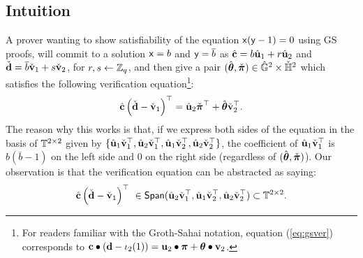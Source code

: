 \subsection{Intuition} \label{sect:intuition}
%
A prover wanting to show satisfiability of the equation  $\mathsf{x}(\mathsf{y}-1)=0$ using GS proofs, will commit to a solution  
$\mathsf{x}=b$ and $\mathsf{y}=\overline{b}$ as $\hat{\mathbf{c}}=b \hat{\mathbf{u}}_1 + r \hat{\mathbf{u}}_2$ and 
 $\check{\mathbf{d}}=\overline{b} \check{\mathbf{v}}_1 + s \check{\mathbf{v}}_2$, for $r,s \leftarrow \mathbb{Z}_q$, and then give a pair $(\hat{{\boldsymbol \theta}},\check{{\boldsymbol \pi}})
\in {\ensuremath{\hat{\mathbb{G}}}}^{2} \times {\ensuremath{\check{\mathbb{H}}}}^{2}$ which satisfies the following verification equation\footnote{For readers familiar with the Groth-Sahai notation, equation (\ref{eq:gsver}) corresponds to 
$\mathbf{c} \bullet \left(\mathbf{d}-\iota_2(1)\right) = \mathbf{u}_2 \bullet {\boldsymbol \pi} + {\boldsymbol \theta} \bullet \mathbf{v}_2$.}:
\begin{equation} \label{eq:gsver}
\hat{\mathbf{c}} \left(\check{\mathbf{d}}-
 \check{\mathbf{v}}_1\right)^{\top}=\hat{\mathbf{u}}_2  
\check{\boldsymbol \pi}^{\top}+ \hat{\boldsymbol \theta}   \check{\mathbf{v}}_2^{\top}. 
\end{equation}
The reason why this works is that, if we express both sides of the equation in the basis of 
$\mathbb{T}^{2\times 2}$ given by 
$\{\hat{\mathbf{u}}_1\check{\mathbf{v}}_1^{\top},\hat{\mathbf{u}}_2\check{\mathbf{v}}_1^{\top},\hat{\mathbf{u}}_1\check{\mathbf{v}}_2^{\top},\hat{\mathbf{u}}_2\check{\mathbf{v}}_2^{\top}\}$, the coefficient of 
$\hat{\mathbf{u}}_1\check{\mathbf{v}}_1^{\top}$ is $b(\overline{b}-1)$ on the left side and $0$ on the right side (regardless of
$(\hat{{\boldsymbol \theta}},\check{{\boldsymbol \pi}})$).
Our observation is that the verification equation can be abstracted as saying:
\begin{equation}\label{eq:gsabstracted}
\hat{\vecb{c}} \left(\check{\vecb{d}}-\check{\vecb{v}}_1\right)^{\top} \ \in \mathsf{Span}(\hat{\vecb{u}}_2\check{\vecb{v}}_1^{\top},\hat{\vecb{u}}_1\check{\vecb{v}}_2^{\top},\hat{\vecb{u}}_2\check{\vecb{v}}_2^{\top}) \subset  \T^{2 \times 2}. 
\end{equation}

